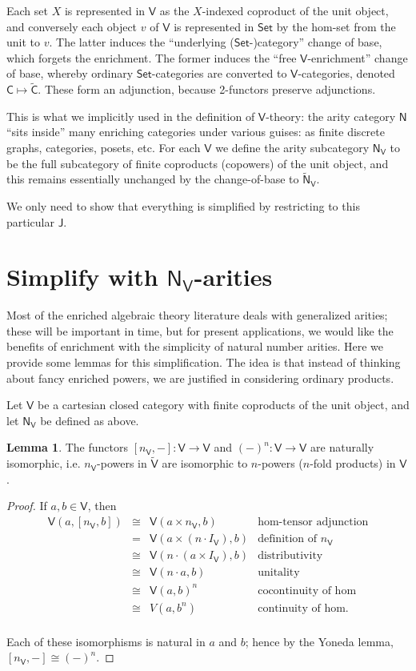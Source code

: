 \documentclass{amsart}
\theoremstyle{definition}
\newtheorem{lemma}[theorem]{Lemma}
\newcommand{\Set}{\mathsf{Set}}
\newcommand{\NN}{\mathsf{N}}
\newcommand{\V}{\mathsf{V}}
\newcommand{\C}{\mathsf{C}}
\newcommand{\J}{\mathsf{J}}
\newcommand{\maps}{\colon}
\begin{document}
Each set $X$ is represented in $\V$ as the $X$-indexed coproduct of the unit object, and conversely each object $v$ of $\V$ is represented in $\Set$ by the hom-set from the unit to $v$. The latter induces the ``underlying ($\Set$-)category'' change of base, which forgets the enrichment. The former induces the ``free $\V$-enrichment'' change of base, whereby ordinary $\Set$-categories are converted to $\V$-categories, denoted $\C \mapsto \tilde{\C}$. These form an adjunction, because 2-functors preserve adjunctions.

This is what we implicitly used in the definition of $\V$-theory: the arity category $\NN$ ``sits inside'' many enriching categories under various guises: as finite discrete graphs, categories, posets, etc. For each $\V$ we define the arity subcategory $\NN_\V$ to be the full subcategory of finite coproducts (copowers) of the unit object, and this remains essentially unchanged by the change-of-base to $\tilde{\NN}_\V$.

We only need to show that everything is simplified by restricting to this particular $\J$.

\section{Simplify with $\NN_\V$-arities}

Most of the enriched algebraic theory literature deals with generalized arities; these will be important in time, but for present applications, we would like the benefits of enrichment with the simplicity of natural number arities. Here we provide some lemmas for this simplification. The idea is that instead of thinking about fancy enriched powers, we are justified in considering ordinary products.

Let $\V$ be a cartesian closed category with finite coproducts of the unit object, and let $\NN_\V$ be defined as above.

\begin{lemma}
	The functors $[n_\V,-]\maps \V\to \V$ and $(-)^n\maps \V\to \V$ are naturally isomorphic, i.e. $n_\V$-powers in $\tilde{\V}$ are isomorphic to $n$-powers ($n$-fold products) in $\V$.
\end{lemma}
\begin{proof}
	If $a,b \in \V$, then
	\[\begin{array}{rcll}
	\V(a,[n_\V,b]) & \cong & \V(a\times n_\V,b) & \text{hom-tensor adjunction}\\
	& = & \V(a\times (n \cdot I_\V),b) & \text{definition of } n_\V\\
	& \cong & \V(n \cdot (a\times I_\V),b) & \text{distributivity}\\
	& \cong & \V(n\cdot a,b) & \text{unitality}\\
	& \cong & \V(a,b)^n & \text{cocontinuity of hom}\\
	& \cong & V(a,b^n) & \text{continuity of hom}.\\
	\end{array}\]

Each of these isomorphisms is natural in $a$ and $b$; hence by the Yoneda lemma, $[n_\V,-] \cong (-)^n$.
\end{proof}
\end{document}
